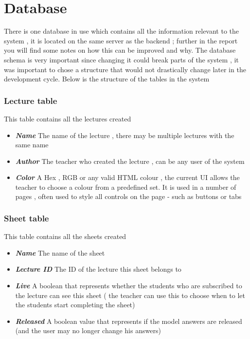 \section{Database}
There is one database in use which contains all the information relevant to the system , it is located on the same server as the backend ; further in the report you will find some notes on how this can be improved and why.
The database schema is very important since changing it could break parts of the system , it was important to chose a structure that would not drastically change later in the development cycle.
Below is the structure of the tables in the system

\subsubsection{Lecture table}
This table contains all the lectures created

\begin{itemize}
	\item \textit{\textbf{Name}} The name of the lecture , there may be multiple lectures with the same name
	\item  \textit{\textbf{Author}} The teacher who created the lecture , can be any user of the system
	\item  \textit{\textbf{Color}} A Hex , RGB or any valid HTML colour , the current UI allows the teacher to choose a colour from a predefined set. It is used in a number of pages , often used to style all controls on the page - such as buttons or tabs	
\end{itemize}

\subsubsection{Sheet table}
This table contains all the sheets created

\begin{itemize}
	\item  \textit{\textbf{Name}} The name of the sheet
	\item  \textit{\textbf{Lecture ID}} The ID of the lecture this sheet belongs to
	\item  \textit{\textbf{Live}} A boolean that represents whether the students who are subscribed to the lecture can see this sheet ( the teacher can use this to choose when to let the students start completing the sheet)
	\item  \textit{\textbf{Released}} A boolean value that represents if the model answers are released (and the user may no longer change his answers)
\end{itemize}

